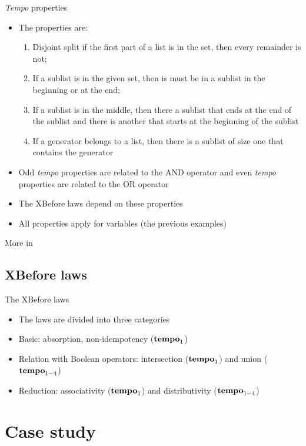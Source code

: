 \documentclass{beamer}
\def\tempoop{\ensuremath\operatorname{\mathbf{tempo}}}
\newcommand{\tempo}[2][1-4]{\ensuremath\tempoop_{#1} #2}
\begin{document}
\begin{frame}[label=tempo]{\emph{Tempo} properties}
	\begin{itemize}
		\item The properties are:
		\begin{enumerate}
			\item Disjoint split if the first part of a list is in the set, then every remainder is not;
			\item If a sublist is in the given set, then is must be in a sublist in the beginning or at the end;
			\item If a sublist is in the middle, then there a sublist that ends at the end of the sublist and there is another that starts at the beginning of the sublist
			\item If a generator belongs to a list, then there is a sublist of size one that contains the generator
		\end{enumerate}
		\item Odd \emph{tempo} properties are related to the AND operator and even \emph{tempo} properties are related to the OR operator
		\item The XBefore laws depend on these properties
		\item All properties apply for variables (the previous examples)
	\end{itemize}
	More in \hyperlink{tempodetail}{}
\end{frame}

\subsection{XBefore laws}

\begin{frame}{The XBefore laws}
	\begin{itemize}
		\item The laws are divided into three categories
		\item Basic: absorption, non-idempotency ($\tempo[1]$)
		\item Relation with Boolean operators: intersection ($\tempo[1]$) and union ($\tempo$)
		\item Reduction: associativity ($\tempo[1]$) and distributivity ($\tempo$)
	\end{itemize}
\end{frame}

\section{Case study}
\end{document}
